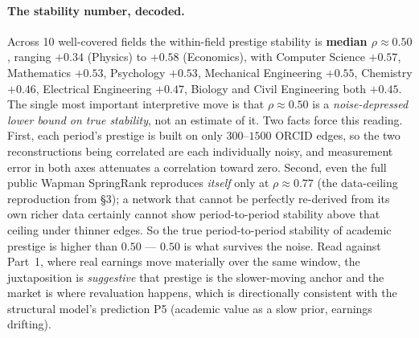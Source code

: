 \documentclass[11pt]{article}
\begin{document}
\paragraph{The stability number, decoded.} Across 10 well-covered fields the within-field prestige stability is \textbf{median $\rho\approx0.50$}, ranging $+0.34$ (Physics) to $+0.58$ (Economics), with Computer Science $+0.57$, Mathematics $+0.53$, Psychology $+0.53$, Mechanical Engineering $+0.55$, Chemistry $+0.46$, Electrical Engineering $+0.47$, Biology and Civil Engineering both $+0.45$. The single most important interpretive move is that $\rho\approx0.50$ is a \emph{noise-depressed lower bound on true stability}, not an estimate of it. Two facts force this reading. First, each period's prestige is built on only $300$--$1500$ ORCID edges, so the two reconstructions being correlated are each individually noisy, and measurement error in both axes attenuates a correlation toward zero. Second, even the full public Wapman SpringRank reproduces \emph{itself} only at $\rho\approx0.77$ (the data-ceiling reproduction from \S3); a network that cannot be perfectly re-derived from its own richer data certainly cannot show period-to-period stability above that ceiling under thinner edges. So the true period-to-period stability of academic prestige is higher than $0.50$ --- $0.50$ is what survives the noise. Read against Part~1, where real earnings move materially over the same window, the juxtaposition is \emph{suggestive} that prestige is the slower-moving anchor and the market is where revaluation happens, which is directionally consistent with the structural model's prediction P5 (academic value as a slow prior, earnings drifting).
\end{document}
